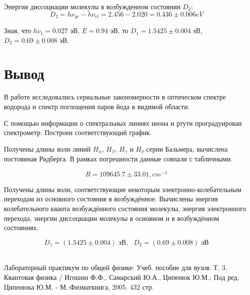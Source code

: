 \documentclass[14pt,a4paper]{scrartcl}
\begin{document}
Энергия диссоциации молекулы в возбужденном состоянии $D_2$:
\[D_2 = h\nu_{gr} - h\nu_{el} = 2.456 - 2.020 = 0.436\pm0.006eV\]




Зная, что $h\nu_1 = 0.027$ эВ, $E = 0.94$ эВ, то $D_1 = 1.5425 \pm 0.004$ эВ, $D_2=0.69 \pm 0.008$ эВ.


\section{Вывод}

В работе исследовались сериальные закономерности в оптическом спектре водорода и спектр поглощения паров йода в видимой области.
	
	С помощью информации о спектральных линиях неона и ртути проградуирован спектрометр. Построен соответствующий график.
	
	Получены длины волн линий $H_{\alpha}$, $H_{\beta}$, $H_{\gamma}$ и $ H_\delta $ серии Бальмера, вычислена постоянная Ридберга. В рамках погрешности данные совпали с табличными.
	
	$$R = 109645.7 \pm 33.01, cm^{-1}$$
	
	Получены длины волн, соответствующие некоторым электронно-колебательным переходам из основного состояния в возбуждённое. Вычислены энергия колебательного кванта возбуждённого состояния молекулы, энергия электронного перехода, энергии диссоциации молекулы в основном и в возбуждённом состояниях.


    $$D_1 = (1.5425 \pm 0.004)  \text{ эВ},\text{  } D_2 = (0.69 \pm 0.008) \text{ эВ}$$ \\







\begin{thebibliography}{}

Лабораторный практикум по общей физике: Учеб. пособие для вузов. Т. 3. Квантовая физика / Игошин Ф.Ф., Самарский Ю.А., Ципенюк Ю.М.; Под ред. Ципенюка Ю.М. - М.:Физматкнига, 2005. 432 стр.



	
\end{thebibliography}
\end{document}
